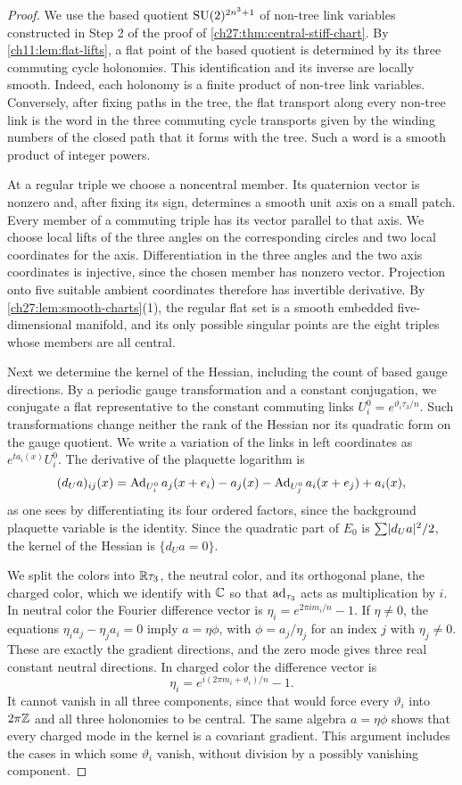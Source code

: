 \begin{proof}
We use the based quotient $\mathrm{SU}(2)^{2n^3+1}$ of non-tree link variables constructed in Step 2 of the proof of \cref{ch27:thm:central-stiff-chart}. By \cref{ch11:lem:flat-lifts}, a flat point of the based quotient is determined by its three commuting cycle holonomies. This identification and its inverse are locally smooth. Indeed, each holonomy is a finite product of non-tree link variables. Conversely, after fixing paths in the tree, the flat transport along every non-tree link is the word in the three commuting cycle transports given by the winding numbers of the closed path that it forms with the tree. Such a word is a smooth product of integer powers.

At a regular triple we choose a noncentral member. Its quaternion vector is nonzero and, after fixing its sign, determines a smooth unit axis on a small patch. Every member of a commuting triple has its vector parallel to that axis. We choose local lifts of the three angles on the corresponding circles and two local coordinates for the axis. Differentiation in the three angles and the two axis coordinates is injective, since the chosen member has nonzero vector. Projection onto five suitable ambient coordinates therefore has invertible derivative. By \cref{ch27:lem:smooth-charts}(1), the regular flat set is a smooth embedded five-dimensional manifold, and its only possible singular points are the eight triples whose members are all central.

Next we determine the kernel of the Hessian, including the count of based gauge directions. By a periodic gauge transformation and a constant conjugation, we conjugate a flat representative to the constant commuting links $U_i^0=e^{\vartheta_i\tau_3/n}$. Such transformations change neither the rank of the Hessian nor its quadratic form on the gauge quotient. We write a variation of the links in left coordinates as $e^{ta_i(x)}U_i^0$. The derivative of the plaquette logarithm is
\[
 (d_Ua)_{ij}(x)=\operatorname{Ad}_{U_i^0}a_j(x+e_i)-a_j(x)-\operatorname{Ad}_{U_j^0}a_i(x+e_j)+a_i(x),
\]
as one sees by differentiating its four ordered factors, since the background plaquette variable is the identity. Since the quadratic part of $E_0$ is $\sum\lvert d_Ua\rvert^2/2$, the kernel of the Hessian is $\{d_Ua=0\}$.

We split the colors into $\mathbb R\tau_3$, the neutral color, and its orthogonal plane, the charged color, which we identify with $\mathbb C$ so that $\operatorname{ad}_{\tau_3}$ acts as multiplication by $i$. In neutral color the Fourier difference vector is $\eta_i=e^{2\pi im_i/n}-1$. If $\eta\ne0$, the equations $\eta_ia_j-\eta_ja_i=0$ imply $a=\eta\phi$, with $\phi=a_j/\eta_j$ for an index $j$ with $\eta_j\ne0$. These are exactly the gradient directions, and the zero mode gives three real constant neutral directions. In charged color the difference vector is
\[
 \eta_i=e^{i(2\pi m_i+\vartheta_i)/n}-1.
\]
It cannot vanish in all three components, since that would force every $\vartheta_i$ into $2\pi\mathbb Z$ and all three holonomies to be central. The same algebra $a=\eta\phi$ shows that every charged mode in the kernel is a covariant gradient. This argument includes the cases in which some $\vartheta_i$ vanish, without division by a possibly vanishing component.


\end{proof}
